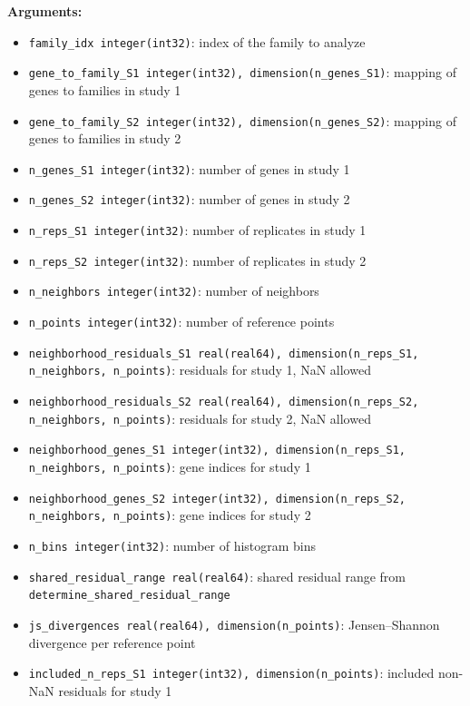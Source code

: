 \begin{enumerate}
        \textbf{Arguments:}
        \begin{itemize}
            \item \lstinline!family_idx integer(int32)!: index of the family to analyze
            \item \lstinline!gene_to_family_S1 integer(int32), dimension(n_genes_S1)!: mapping of genes to families in study 1
            \item \lstinline!gene_to_family_S2 integer(int32), dimension(n_genes_S2)!: mapping of genes to families in study 2
            \item \lstinline!n_genes_S1 integer(int32)!: number of genes in study 1
            \item \lstinline!n_genes_S2 integer(int32)!: number of genes in study 2
            \item \lstinline!n_reps_S1 integer(int32)!: number of replicates in study 1
            \item \lstinline!n_reps_S2 integer(int32)!: number of replicates in study 2
            \item \lstinline!n_neighbors integer(int32)!: number of neighbors
            \item \lstinline!n_points integer(int32)!: number of reference points
            \item \lstinline!neighborhood_residuals_S1 real(real64), dimension(n_reps_S1, n_neighbors, n_points)!: residuals for study 1, NaN allowed
            \item \lstinline!neighborhood_residuals_S2 real(real64), dimension(n_reps_S2, n_neighbors, n_points)!: residuals for study 2, NaN allowed
            \item \lstinline!neighborhood_genes_S1 integer(int32), dimension(n_reps_S1, n_neighbors, n_points)!: gene indices for study 1
            \item \lstinline!neighborhood_genes_S2 integer(int32), dimension(n_reps_S2, n_neighbors, n_points)!: gene indices for study 2
            \item \lstinline!n_bins integer(int32)!: number of histogram bins
            \item \lstinline!shared_residual_range real(real64)!: shared residual range from \lstinline!determine_shared_residual_range!
            \item \lstinline!js_divergences real(real64), dimension(n_points)!: Jensen–Shannon divergence per reference point
            \item \lstinline!included_n_reps_S1 integer(int32), dimension(n_points)!: included non-NaN residuals for study 1

\end{itemize}
\end{enumerate}
